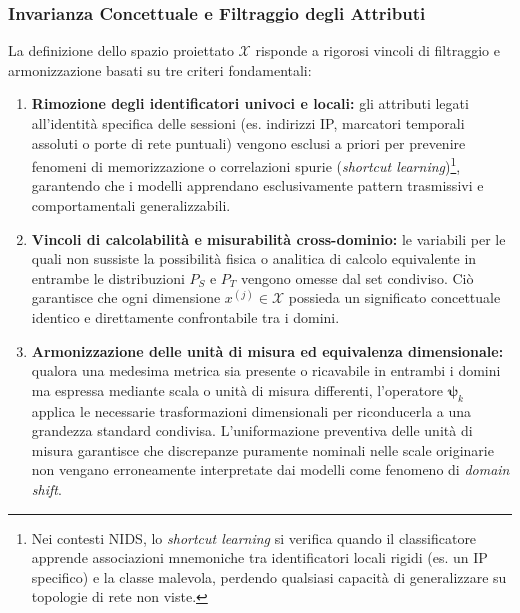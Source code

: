 \subsubsection{Invarianza Concettuale e Filtraggio degli Attributi}
\label{subsubsec:invarianza_filtraggio}
La definizione dello spazio proiettato $\mathcal{X}$ risponde a rigorosi vincoli di filtraggio e armonizzazione basati su tre criteri fondamentali:
\begin{enumerate}
    \item \textbf{Rimozione degli identificatori univoci e locali:} gli attributi legati all'identità specifica delle sessioni (es. indirizzi IP, marcatori temporali assoluti o porte di rete puntuali) vengono esclusi a priori per prevenire fenomeni di memorizzazione o correlazioni spurie (\textit{shortcut learning})\footnote{Nei contesti NIDS, lo \textit{shortcut learning} si verifica quando il classificatore apprende associazioni mnemoniche tra identificatori locali rigidi (es. un IP specifico) e la classe malevola, perdendo qualsiasi capacità di generalizzare su topologie di rete non viste.}, garantendo che i modelli apprendano esclusivamente pattern trasmissivi e comportamentali generalizzabili.
    \item \textbf{Vincoli di calcolabilità e misurabilità cross-dominio:} le variabili per le quali non sussiste la possibilità fisica o analitica di calcolo equivalente in entrambe le distribuzioni $P_S$ e $P_T$ vengono omesse dal set condiviso. Ciò garantisce che ogni dimensione $x^{(j)} \in \mathcal{X}$ possieda un significato concettuale identico e direttamente confrontabile tra i domini.
    \item \textbf{Armonizzazione delle unità di misura ed equivalenza dimensionale:} qualora una medesima metrica sia presente o ricavabile in entrambi i domini ma espressa mediante scala o unità di misura differenti, l'operatore $\boldsymbol{\psi}_k$ applica le necessarie trasformazioni dimensionali per riconducerla a una grandezza standard condivisa. L'uniformazione preventiva delle unità di misura garantisce che discrepanze puramente nominali nelle scale originarie non vengano erroneamente interpretate dai modelli come fenomeno di \textit{domain shift}.
\end{enumerate}

